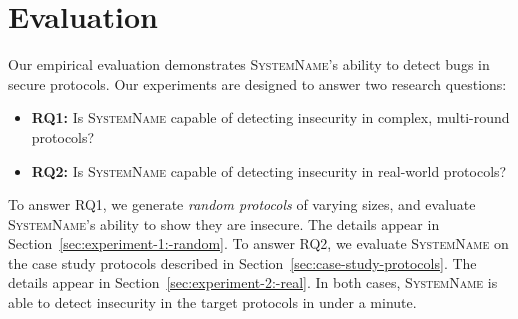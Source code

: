 \documentclass[conference]{IEEEtran}
\renewcommand{\paragraph}[1]{\vspace*{2pt}\noindent\textbf{#1}}
\newcommand{\system}{\textsc{SystemName}\xspace}
\begin{document}


\section{Evaluation}

Our empirical evaluation demonstrates \system's ability to detect bugs in secure protocols. Our experiments are designed to answer two research questions:
%
\begin{itemize}
\item \textbf{RQ1:} Is \system capable of detecting insecurity in complex, multi-round protocols?
\item \textbf{RQ2:} Is \system capable of detecting insecurity in real-world protocols?
\end{itemize}
%
To answer RQ1, we generate \emph{random protocols} of varying sizes, and evaluate \system's ability to show they are insecure. The details appear in Section~\ref{sec:experiment-1:-random}. To answer RQ2, we evaluate \system on the case study protocols described in Section~\ref{sec:case-study-protocols}. The details appear in Section~\ref{sec:experiment-2:-real}. In both cases, \system is able to detect insecurity in the target protocols in under a minute.
\end{document}
